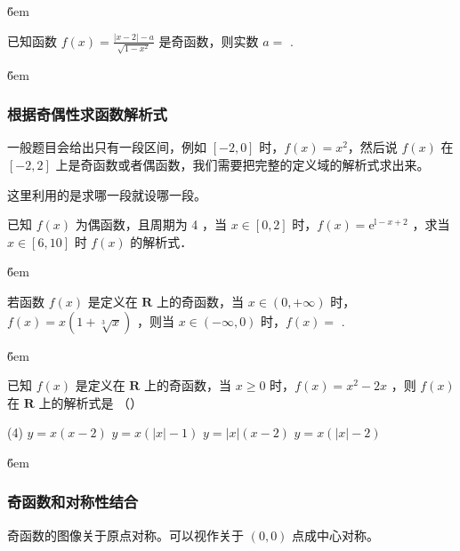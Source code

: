 \v{6em}

\begin{example}
    已知函数 $f(x)=\frac{|x-2|-a}{\sqrt{1-x^2}}$ 是奇函数，则实数 $a=$ \underline{\qquad}.
\end{example}

\v{6em}

\subsubsection{根据奇偶性求函数解析式}

\begin{theorem}[根据奇偶性求函数解析式]
    一般题目会给出只有一段区间，例如 $[-2,0]$ 时，$f(x) = x^2$，然后说 $f(x)$ 在 $[-2,2]$ 上是奇函数或者偶函数，我们需要把完整的定义域的解析式求出来。

    这里利用的是求哪一段就设哪一段。
\end{theorem}

\begin{example}
    已知 $f(x)$ 为偶函数，且周期为 4 ，当 $x \in[0,2]$ 时，$f(x)=\mathrm{e}^{\mathrm{l}-x+2}$ ，求当 $x \in[6,10]$ 时 $f(x)$ 的解析式．
\end{example}

\v{6em}

\begin{example}
    若函数 $f(x)$ 是定义在 $\mathbf{R}$ 上的奇函数，当 $x \in(0,+\infty)$ 时，$f(x)=x(1+\sqrt[3]{x})$ ，则当 $x \in(-\infty, 0)$ 时，$f(x)=$ \underline{\qquad}.
\end{example}

\v{6em}

\begin{example}
    已知 $f(x)$ 是定义在 $\mathbf{R}$ 上的奇函数，当 $x \geq 0$ 时，$f(x)=x^2-2 x$ ，则 $f(x)$ 在 $\mathbf{R}$ 上的解析式是 （\qquad）
    \begin{tasks}(4)
        \task $y=x(x-2)$
        \task $y=x(|x|-1)$
        \task $y=|x|(x-2)$
        \task $y=x(|x|-2)$
    \end{tasks}
\end{example}

\v{6em}

\subsubsection{奇函数和对称性结合}

\begin{theorem}
    奇函数的图像关于原点对称。可以视作关于 $(0,0)$ 点成中心对称。
\end{theorem}

